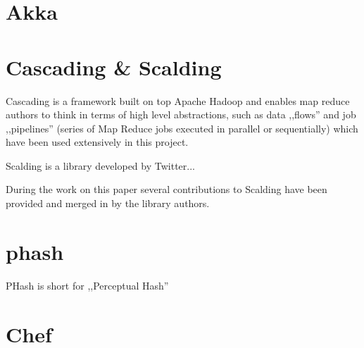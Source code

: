 \section{Akka}
\label{sec:akka}


\section{Cascading \& Scalding}
\label{sec:chef}
Cascading is a framework built on top Apache Hadoop and enables map reduce authors to think in terms of high level abstractions, such as data ,,flows'' 
and job ,,pipelines'' (series of Map Reduce jobs executed in parallel or sequentially) which have been used extensively in this project.

Scalding is a library developed by Twitter...

During the work on this paper several contributions to Scalding have been provided and merged in by the library authors. 


\section{phash}
\label{sec:phash}
PHash is short for ,,Perceptual Hash''


\section{Chef}
\label{sec:chef}



